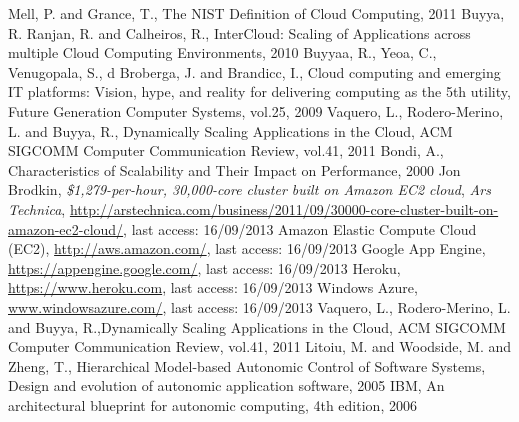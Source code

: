 \documentclass[twocolumn]{svjour3}          %
\begin{document}
\begin{thebibliography}{}
%
%
  {Mell, P. and Grance, T.}, {The NIST Definition of Cloud Computing}, 2011
  {Buyya, R. Ranjan, R. and Calheiros, R.}, {InterCloud: Scaling of Applications across multiple Cloud Computing Environments}, 2010
  {Buyyaa, R., Yeoa, C., Venugopala, S., d Broberga, J. and Brandicc, I.}, {Cloud computing and emerging IT platforms: Vision, hype, and reality for delivering computing as the 5th utility}, {Future Generation Computer Systems}, vol.25, 2009
  {Vaquero, L., Rodero-Merino, L. and Buyya, R.}, {Dynamically Scaling Applications in the Cloud}, {ACM SIGCOMM Computer Communication Review}, vol.41, 2011
  Bondi, A., {Characteristics of Scalability and Their Impact on Performance}, 2000
  Jon Brodkin, \emph{\$1,279-per-hour, 30,000-core cluster built on Amazon EC2 cloud}, {\emph{Ars Technica}, \url{http://arstechnica.com/business/2011/09/30000-core-cluster-built-on-amazon-ec2-cloud/}}, last access: 16/09/2013
  {Amazon Elastic Compute Cloud (EC2)}, {\url{http://aws.amazon.com/}}, last access: 16/09/2013 
  {Google App Engine}, {\url{https://appengine.google.com/}}, last access: 16/09/2013 
  {Heroku}, {\url{https://www.heroku.com}}, last access: 16/09/2013 
  {Windows Azure}, {\url{www.windowsazure.com/}}, last access: 16/09/2013 
  {Vaquero, L., Rodero-Merino, L. and Buyya, R.},{Dynamically Scaling Applications in the Cloud}, {ACM SIGCOMM Computer Communication Review}, vol.41, 2011
 {Litoiu, M. and Woodside, M. and Zheng, T.}, {Hierarchical Model-based Autonomic Control of Software Systems}, {Design and evolution of autonomic application software}, 2005
 {IBM}, {An architectural blueprint for autonomic computing, 4th edition}, 2006


\end{thebibliography}
\end{document}

